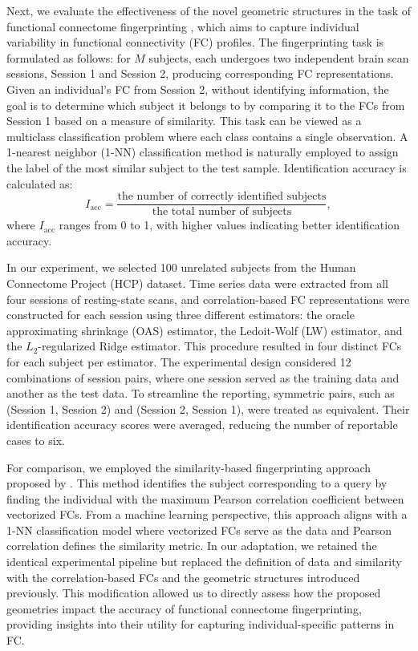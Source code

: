 \documentclass[10pt]{article}
\begin{document}
Next, we evaluate the effectiveness of the novel geometric structures in the task of functional connectome fingerprinting \citep{finn_2015_FunctionalConnectomeFingerprinting}, which aims to capture individual variability in functional connectivity (FC) profiles. The fingerprinting task is formulated as follows: for 
$M$ subjects, each undergoes two independent brain scan sessions, Session 1 and Session 2, producing corresponding FC representations. Given an individual's FC from Session 2, without identifying information, the goal is to determine which subject it belongs to by comparing it to the FCs from Session 1 based on a measure of similarity. This task can be viewed as a multiclass classification problem where each class contains a single observation. A 1-nearest neighbor (1-NN) classification method is naturally employed to assign the label of the most similar subject to the test sample. Identification accuracy is calculated as:
\begin{equation*} 
	I_{\text{acc}} = \frac{\text{the number of correctly identified subjects}}{\text{the total number of subjects}}, 
\end{equation*}
where $I_{\text{acc}}$ ranges from 0 to 1, with higher values indicating better identification accuracy.

In our experiment, we selected 100 unrelated subjects from the Human Connectome Project (HCP) dataset. Time series data were extracted from all four sessions of resting-state scans, and correlation-based FC representations were constructed for each session using three different estimators: the oracle approximating shrinkage (OAS) estimator, the Ledoit-Wolf (LW) estimator, and the $L_2$-regularized Ridge estimator. This procedure resulted in four distinct FCs for each subject per estimator. The experimental design considered 12 combinations of session pairs, where one session served as the training data and another as the test data. To streamline the reporting, symmetric pairs, such as (Session 1, Session 2) and (Session 2, Session 1), were treated as equivalent. Their identification accuracy scores were averaged, reducing the number of reportable cases to six.

For comparison, we employed the similarity-based fingerprinting approach proposed by \cite{finn_2015_FunctionalConnectomeFingerprinting}. This method identifies the subject corresponding to a query by finding the individual with the maximum Pearson correlation coefficient between vectorized FCs. From a machine learning perspective, this approach aligns with a 1-NN classification model where vectorized FCs serve as the data and Pearson correlation defines the similarity metric. In our adaptation, we retained the identical experimental pipeline but replaced the definition of data and similarity with the correlation-based FCs and the geometric structures introduced previously. This modification allowed us to directly assess how the proposed geometries impact the accuracy of functional connectome fingerprinting, providing insights into their utility for capturing individual-specific patterns in FC.
\end{document}
